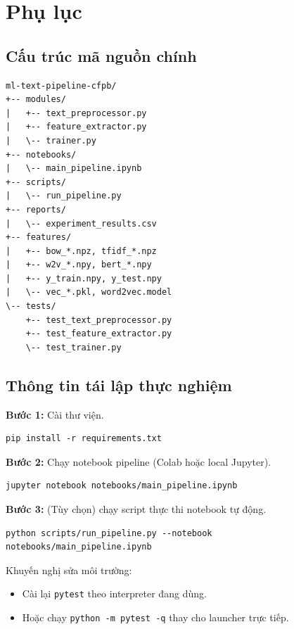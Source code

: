 \section{Phụ lục}

\subsection{Cấu trúc mã nguồn chính}
\begin{verbatim}
ml-text-pipeline-cfpb/
+-- modules/
|   +-- text_preprocessor.py
|   +-- feature_extractor.py
|   \-- trainer.py
+-- notebooks/
|   \-- main_pipeline.ipynb
+-- scripts/
|   \-- run_pipeline.py
+-- reports/
|   \-- experiment_results.csv
+-- features/
|   +-- bow_*.npz, tfidf_*.npz
|   +-- w2v_*.npy, bert_*.npy
|   +-- y_train.npy, y_test.npy
|   \-- vec_*.pkl, word2vec.model
\-- tests/
    +-- test_text_preprocessor.py
    +-- test_feature_extractor.py
    \-- test_trainer.py
\end{verbatim}

\subsection{Thông tin tái lập thực nghiệm}
\textbf{Bước 1:} Cài thư viện.
\begin{verbatim}
pip install -r requirements.txt
\end{verbatim}

\textbf{Bước 2:} Chạy notebook pipeline (Colab hoặc local Jupyter).
\begin{verbatim}
jupyter notebook notebooks/main_pipeline.ipynb
\end{verbatim}

\textbf{Bước 3:} (Tùy chọn) chạy script thực thi notebook tự động.
\begin{verbatim}
python scripts/run_pipeline.py --notebook notebooks/main_pipeline.ipynb
\end{verbatim}

Khuyến nghị sửa môi trường:
\begin{itemize}[nosep]
    \item Cài lại \texttt{pytest} theo interpreter đang dùng.
    \item Hoặc chạy \texttt{python -m pytest -q} thay cho launcher trực tiếp.
\end{itemize}

